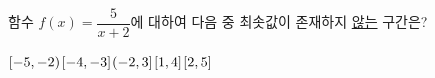 함수 $f(x)=\dfrac{5}{x+2}$에 대하여 다음 중 최솟값이 존재하지 \underline{않는} 구간은?
\begin{choices32}{$[-5{,}\mkern3mu\mathopen{}-2)$}{$[-4{,}\mkern3mu\mathopen{}-3]$}{$(-2{,}\mkern3mu\mathopen{}3]$}{$[1{,}\mkern3mu\mathopen{}4]$}{$[2{,}\mkern3mu\mathopen{}5]$}\end{choices32}
